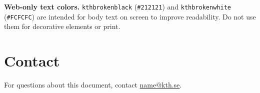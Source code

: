 \begin{kthnotebox}
  \textbf{Web-only text colors.}
  \texttt{kthbrokenblack} (\texttt{\#212121}) and \texttt{kthbrokenwhite}
  (\texttt{\#FCFCFC}) are intended for body text on screen to improve
  readability. Do not use them for decorative elements or print.
\end{kthnotebox}


\section{Contact}

For questions about this document, contact
\href{mailto:name@kth.se}{name@kth.se}.


